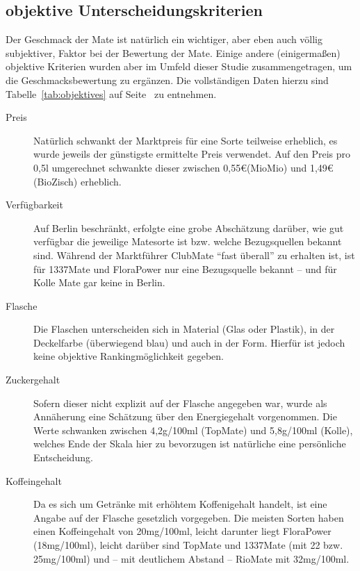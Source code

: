 \documentclass[11pt,a4paper,ngerman]{article}
\begin{document}
\subsection{objektive Unterscheidungskriterien}\label{sec:objektives}
Der Geschmack der Mate ist natürlich ein wichtiger, aber eben auch völlig subjektiver, Faktor bei der Bewertung der Mate. Einige andere (einigermaßen) objektive Kriterien wurden aber im Umfeld dieser Studie zusammengetragen, um die Geschmacksbewertung zu ergänzen. Die vollständigen Daten hierzu sind Tabelle~\ref{tab:objektives} auf Seite~\pageref{tab:objektives} zu entnehmen.

\begin{description}
 \item[Preis] 
    Natürlich schwankt der Marktpreis für eine Sorte teilweise erheblich, es wurde jeweils der günstigste ermittelte Preis verwendet. Auf den Preis pro 0,5l umgerechnet schwankte dieser zwischen 0,55\euro (MioMio) und 1,49\euro (BioZisch) erheblich.

 \item[Verfügbarkeit] 
    Auf Berlin beschränkt, erfolgte eine grobe Abschätzung darüber, wie gut verfügbar die jeweilige Matesorte ist bzw. welche Bezugsquellen bekannt sind. Während der Marktführer ClubMate "`fast überall"' zu erhalten ist, ist für 1337Mate und FloraPower nur eine Bezugsquelle bekannt -- und für Kolle Mate gar keine in Berlin.

 \item[Flasche] 
    Die Flaschen unterscheiden sich in Material (Glas oder Plastik), in der Deckelfarbe (überwiegend blau) und auch in der Form. Hierfür ist jedoch keine objektive Rankingmöglichkeit gegeben.

 \item[Zuckergehalt] 
    Sofern dieser nicht explizit auf der Flasche angegeben war, wurde als Annäherung eine Schätzung über den Energiegehalt vorgenommen.
    Die Werte schwanken zwischen 4,2g/100ml (TopMate) und 5,8g/100ml (Kolle), welches Ende der Skala hier zu bevorzugen ist natürliche eine persönliche Entscheidung. 

 \item[Koffeingehalt] Da es sich um Getränke mit erhöhtem Koffenigehalt handelt, ist eine Angabe auf der Flasche gesetzlich vorgegeben. Die meisten Sorten haben einen Koffeingehalt von 20mg/100ml, leicht darunter liegt FloraPower (18mg/100ml), leicht darüber sind TopMate und 1337Mate (mit 22 bzw. 25mg/100ml) und -- mit deutlichem Abstand -- RioMate mit 32mg/100ml.
\end{description}
\end{document}
